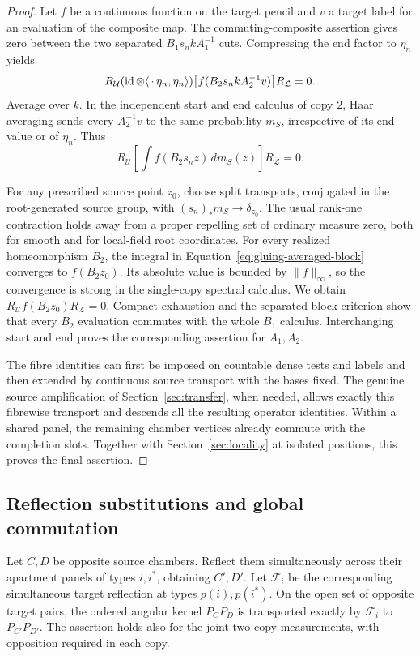 \begin{proof}
Let $f$ be a continuous function on the target pencil and
$v$ a target label for an evaluation of the composite map.
The commuting-composite assertion gives zero between the
two separated $B_1s_nkA_1^{-1}$ cuts.  Compressing the end
factor to $\eta_n$ yields
\[
 R_{\mathcal U}
  (\operatorname{id}\otimes\langle\,\cdot\,\eta_n,\eta_n\rangle)
   \bigl[f(B_2s_nkA_2^{-1}v)\bigr]
 R_{\mathcal L}=0.
\]
Average over $k$.  In the independent start and end
calculus of copy $2$, Haar averaging sends every
$A_2^{-1}v$ to the same probability $m_S$, irrespective
of its end value or of $\eta_n$.  Thus
\begin{equation}
 \label{eq:gluing-averaged-block}
 R_{\mathcal U}
       \left[\int f(B_2s_nz)\,dm_S(z)\right]
 R_{\mathcal L}=0.
\end{equation}

For any prescribed source point $z_0$, choose split
transports, conjugated in the root-generated source
group, with $(s_n)_*m_S\to\delta_{z_0}$.
The usual rank-one contraction holds away from a proper
repelling set of ordinary measure zero, both for smooth
and for local-field root coordinates.  For every realized
homeomorphism $B_2$, the integral in
Equation~\eqref{eq:gluing-averaged-block} converges to
$f(B_2z_0)$.  Its absolute value is bounded by
$\|f\|_\infty$, so the convergence is strong in the
single-copy spectral calculus.  We obtain
$R_{\mathcal U}f(B_2z_0)R_{\mathcal L}=0$.
Compact exhaustion and the separated-block criterion show
that every $B_2$ evaluation commutes with the whole $B_1$
calculus.  Interchanging start and end proves the
corresponding assertion for $A_1,A_2$.

The fibre identities can first be imposed on countable
dense tests and labels and then extended by continuous
source transport with the bases fixed.  The genuine
source amplification of Section~\ref{sec:transfer}, when
needed, allows exactly this fibrewise transport and
descends all the resulting operator identities.
Within a shared panel, the remaining chamber vertices
already commute with the completion slots.  Together
with Section~\ref{sec:locality} at isolated positions,
this proves the final assertion.
\end{proof}

\subsection{Reflection substitutions and global commutation}

\begin{lemma}
\label{lem:gluing-reflection}
Let $C,D$ be opposite source chambers.  Reflect them
simultaneously across their apartment panels of types
$i,i^*$, obtaining $C',D'$.  Let $\mathcal F_i$ be the
corresponding simultaneous target reflection at types
$p(i),p(i^*)$.  On the open set of opposite target pairs,
the ordered angular kernel $P_CP_D$ is transported
exactly by $\mathcal F_i$ to $P_{C'}P_{D'}$.
The assertion holds also for the joint two-copy
measurements, with opposition required in each copy.
\end{lemma}

